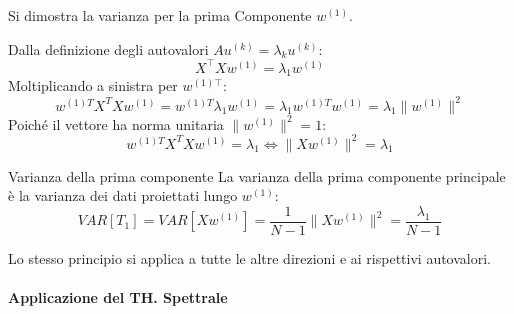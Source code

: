 		Si dimostra la varianza per la prima Componente $w^{(1)}$.
		
		Dalla definizione degli autovalori $Au^{(k)} = \lambda_k u^{(k)}$:
		$$
		X^\top X w^{(1)} = \lambda_1 w^{(1)}
		$$
		Moltiplicando a sinistra per $w^{(1)\top}$:
		$$
		w^{(1)T} X^T X w^{(1)} =w^{(1)T}\lambda_1 w^{(1)}= \lambda_1w^{(1)T}w^{(1)}=\lambda_1 \|w^{(1)}\|^2
		$$
		Poiché il vettore ha norma unitaria $\|w^{(1)}\|^2 = 1$:
		$$
		w^{(1)T} X^T X w^{(1)} =\lambda_1\iff\|X w^{(1)}\|^2 =\lambda_1
		$$
		\begin{mybox2}{Varianza della prima componente}
			La varianza della prima componente principale è la varianza dei dati proiettati lungo $w^{(1)}$:	
			$$
			VAR[T_1]=VAR[Xw^{(1)}] = \frac{1}{N-1} \|X w^{(1)}\|^2=\frac{\lambda_1}{N-1}
			$$
		\end{mybox2}
		Lo stesso principio si applica a tutte le altre direzioni e ai rispettivi autovalori.
	
	
	\paragraph{Applicazione del TH. Spettrale}
	
